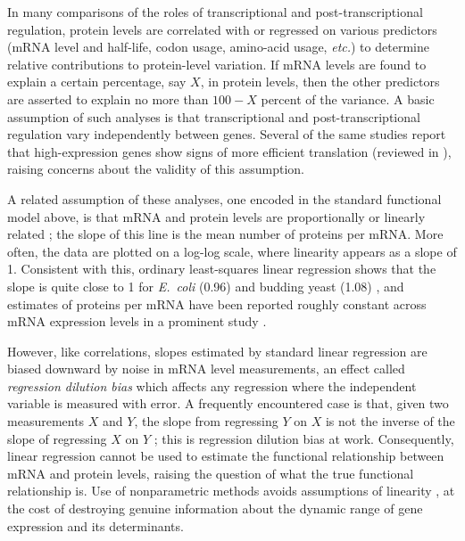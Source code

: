 \documentclass[10pt]{article}
\newcommand{\etc}{\textit{etc.}}
\newcommand{\species}[1]{\textit{#1}}
\begin{document}
In many comparisons of the roles of transcriptional and post-transcriptional regulation, protein levels are correlated with or regressed on various predictors (mRNA level and half-life, codon usage, amino-acid usage, \etc) to determine relative contributions to protein-level variation\cite{Beyer2004,Wu2008,ingolia09, schwanhausser11, desousa09,li14}. If mRNA levels are found to explain a certain percentage, say $X$, in protein levels, then the other predictors are asserted to explain no more than $100-X$ percent of the variance\cite{schwanhausser11,li14,plotkin10,vogel12,Jovanovic2015}. A basic assumption of such analyses is that transcriptional and post-transcriptional regulation vary independently between genes. Several of the same studies report that high-expression genes show signs of more efficient translation \cite{Beyer2004, ingolia09, schwanhausser11} (reviewed in \cite{desousa09}), raising concerns about the validity of this assumption.

A related assumption of these analyses, one encoded in the standard functional model above, is that mRNA and protein levels are proportionally or linearly related \cite{Yu2007, desousa09}; the slope of this line is the mean number of proteins per mRNA. More often, the data are plotted on a log-log scale, where linearity appears as a slope of 1. Consistent with this, ordinary least-squares linear regression shows that the slope is quite close to 1 for \species{E.~coli} (0.96) and budding yeast (1.08) \cite{lu07}, and estimates of proteins per mRNA have been reported roughly constant across mRNA expression levels in a prominent study \cite{ghaemmaghami03}.

However, like correlations, slopes estimated by standard linear regression are biased downward by noise in mRNA level measurements, an effect called \emph{regression dilution bias} \cite{hutcheon10} which affects any regression where the independent variable is measured with error. A frequently encountered case is that, given two measurements $X$ and $Y$, the slope from regressing $Y$ on $X$ is not the inverse of the slope of regressing $X$ on $Y$ \cite{Weisberg2005,legendre98, sokal95}; this is regression dilution bias at work. Consequently, linear regression cannot be used to estimate the functional relationship between mRNA and protein levels, raising the question of what the true functional relationship is. Use of nonparametric methods avoids assumptions of linearity \cite{desousa09}, at the cost of destroying genuine information about the dynamic range of gene expression and its determinants.
\end{document}
